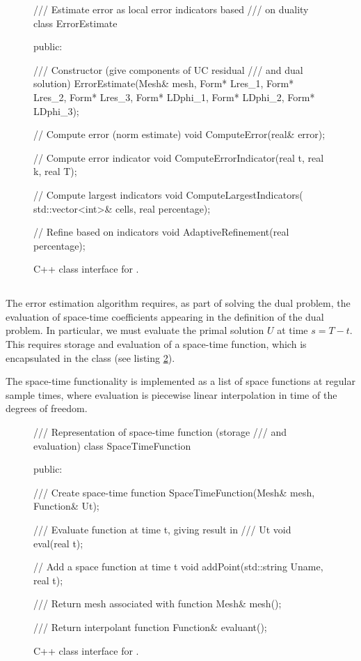 \begin{figure}
\bwfig
\begin{c++}
/// Estimate error as local error indicators based
/// on duality
class ErrorEstimate
{
public:

  /// Constructor (give components of UC residual
  /// and dual solution)
  ErrorEstimate(Mesh& mesh,
		Form* Lres_1,
		Form* Lres_2,
		Form* Lres_3,
		Form* LDphi_1,
		Form* LDphi_2,
		Form* LDphi_3);

  // Compute error (norm estimate)
  void ComputeError(real& error);

  // Compute error indicator
  void ComputeErrorIndicator(real t, real k,
                             real T);

  // Compute largest indicators
  void ComputeLargestIndicators(
    std::vector<int>& cells,
    real percentage);

  // Refine based on indicators
  void AdaptiveRefinement(real percentage);
}
\end{c++}
\caption{C++ class interface for .}
\label{code:ErrorEstimate}
\end{figure}

\subsection{}

The error estimation algorithm requires, as part of solving the dual
problem, the evaluation of space-time coefficients appearing in the
definition of the dual problem. In particular, we must evaluate the
primal solution $U$ at time $s = T - t$.  This requires storage and
evaluation of a space-time function, which is encapsulated in the
 class (see listing
\ref{code:SpaceTimeFunction}).

The space-time functionality is implemented as a list of space
functions at regular sample times, where evaluation is piecewise
linear interpolation in time of the degrees of freedom.

\begin{figure}
\bwfig
\begin{c++}
/// Representation of space-time function (storage
/// and evaluation)
class SpaceTimeFunction
{
public:

  /// Create space-time function
  SpaceTimeFunction(Mesh& mesh, Function& Ut);

  /// Evaluate function at time t, giving result in
  /// Ut
  void eval(real t);

  // Add a space function at time t
  void addPoint(std::string Uname, real t);

  /// Return mesh associated with function
  Mesh& mesh();

  /// Return interpolant function
  Function& evaluant();
}
\end{c++}
\caption{C++ class interface for .}
\label{code:SpaceTimeFunction}
\end{figure}

